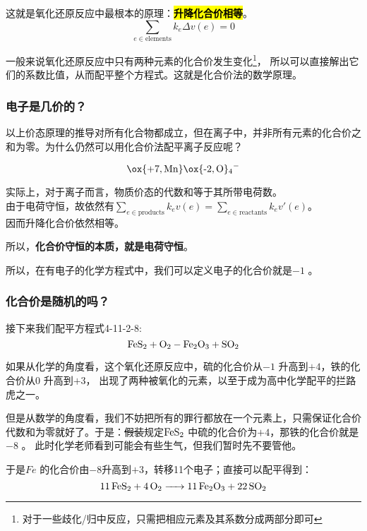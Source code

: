 \documentclass{ctexart}
\begin{document}
这就是氧化还原反应中最根本的原理：\textbf{\hl{升降化合价相等}}。\[
    \sum_{e\in \text{elements}} k_{e} \Delta v(e) = 0
\]

一般来说氧化还原反应中只有两种元素的化合价发生变化\footnote{对于一些歧化/归中反应，只需把相应元素及其系数分成两部分即可}，
所以可以直接解出它们的系数比值，从而配平整个方程式。这就是化合价法的数学原理。
\subsubsection{电子是几价的？}

以上价态原理的推导对所有化合物都成立，但在离子中，并非所有元素的化合价之和为零。为什么仍然可以用化合价法配平离子反应呢？
\vspace{1em}

\noindent
\begin{minipage}[c]{0.2\textwidth}
    \[
        \ce{\ox{+7,Mn}\ox{-2,O}4^-}
    \]
\end{minipage}%
\hfill
\begin{minipage}[c]{0.75\textwidth}
    实际上，对于离子而言，物质价态的代数和等于其所带电荷数。\\由于电荷守恒，故依然有\(\sum_{e\in
        \text{products}} k_{e}v(e) = \sum_{e \in \text{reactants}}
    k_{e}v'(e)\)。\\因而升降化合价依然相等。
\end{minipage}
\vspace{1em}

所以，\textbf{化合价守恒的本质，就是电荷守恒}。

所以，在有电子的化学方程式中，我们可以定义电子的化合价就是\(-1\) 。

\subsubsection{化合价是随机的吗？}

接下来我们配平方程式4-11-2-8:
\[
    \ce{FeS2 + O2 - Fe2O3 + SO2}
\]

如果从化学的角度看，这个氧化还原反应中，硫的化合价从\(-1\) 升高到\(+4\)，铁的化合价从\(0\) 升高到\(+3\)，
出现了两种被氧化的元素，以至于成为高中化学配平的拦路虎之一。

但是从数学的角度看，我们不妨把所有的罪行都放在一个元素上，只需保证化合价代数和为零就好了。于是：\sout{假装}规定\(\ce{FeS2}\)
中硫的化合价为\(+4\)，那铁的化合价就是\(-8\) 。
此时化学老师看到可能会有些生气，但我们暂时先不要管他。

于是\(Fe\) 的化合价由\(-8\)升高到\(+3\)，转移11个电子；直接可以配平得到：\[
    \ce{11FeS2 + 4O2 -> 11Fe2O3 + 22SO2}
\]
\end{document}
